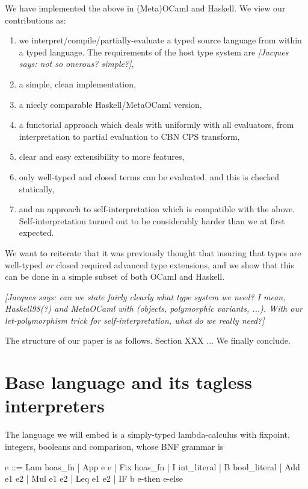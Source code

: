 \documentclass[preprint]{sigplanconf}
\newcommand{\jacques}[1]{{\it [Jacques says: #1]}}
\begin{document}
\noindent We have implemented the above in (Meta)OCaml and Haskell.
We view our contributions as:
\begin{enumerate}
\item we interpret/compile/partially-evaluate a typed source language
   from within a typed language.  The requirements of the host type
   system are \jacques{not so onerous?  simple?},
\item a simple, clean implementation,
\item a nicely comparable Haskell/MetaOCaml version,
\item a functorial approach which deals with uniformly with all
evaluators, from interpretation to partial evaluation to CBN CPS transform,
\item clear and easy extensibility to more features,
\item only well-typed and closed terms can be evaluated, and this is 
checked statically,
\item and an approach to self-interpretation which is compatible with the
  above.  Self-interpretation turned out to be considerably harder than
  we at first expected.
\end{enumerate}

We want to reiterate that it was previously thought that insuring
that types are well-typed \emph{or} closed required advanced type
extensions, and we show that this can be done in a simple subset
of both OCaml and Haskell.

\jacques{can we state fairly clearly what type system we need?  I mean,
Haskell98(?) and MetaOCaml with (objects, polymorphic variants, ...).
With our let-polymorphism trick for self-interpretation, what do we really
need?}

The structure of our paper is as follows. Section XXX ...
We finally conclude.

\section{Base language and its tagless interpreters}\label{language}

The language we will embed is a simply-typed lambda-calculus
with fixpoint, integers, booleans and comparison, whose BNF grammar is

\begin{code}
  e ::= Lam hoas_fn | App e e | Fix hoas_fn |
  I int_literal | B bool_literal | Add e1 e2 | 
  Mul e1 e2 | Leq e1 e2 | IF b e-then e-else
\end{code}
\end{document}
